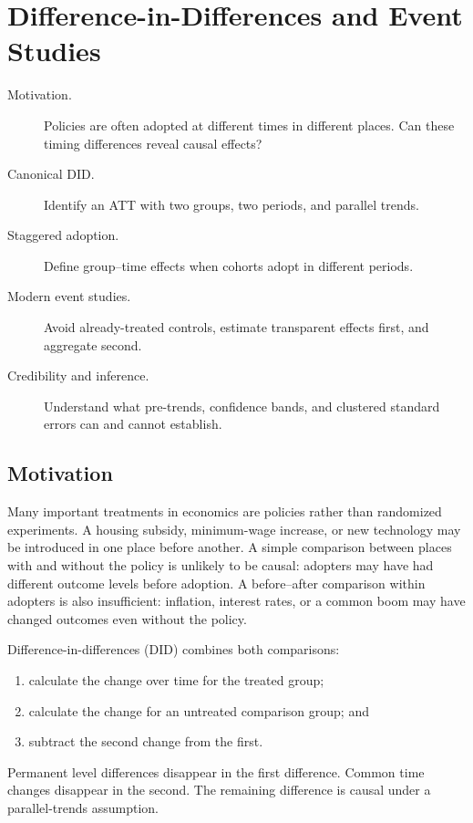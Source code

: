 \chapter{Difference-in-Differences and Event Studies}
\label{ch:did-event-study}
\label{chap:did}

\begin{description}
  \item[Motivation.] Policies are often adopted at different times in different
  places.  Can these timing differences reveal causal effects?
  \item[Canonical DID.] Identify an ATT with two groups, two periods, and
  parallel trends.
  \item[Staggered adoption.] Define group--time effects when cohorts adopt in
  different periods.
  \item[Modern event studies.] Avoid already-treated controls, estimate
  transparent effects first, and aggregate second.
  \item[Credibility and inference.] Understand what pre-trends, confidence
  bands, and clustered standard errors can and cannot establish.
\end{description}

\section{Motivation}

Many important treatments in economics are policies rather than randomized
experiments.  A housing subsidy, minimum-wage increase, or new technology may
be introduced in one place before another.  A simple comparison between places
with and without the policy is unlikely to be causal: adopters may have had
different outcome levels before adoption.  A before--after comparison within
adopters is also insufficient: inflation, interest rates, or a common boom may
have changed outcomes even without the policy.

Difference-in-differences (DID) combines both comparisons:
\begin{enumerate}
  \item calculate the change over time for the treated group;
  \item calculate the change for an untreated comparison group; and
  \item subtract the second change from the first.
\end{enumerate}
Permanent level differences disappear in the first difference.  Common time
changes disappear in the second.  The remaining difference is causal under a
parallel-trends assumption.

